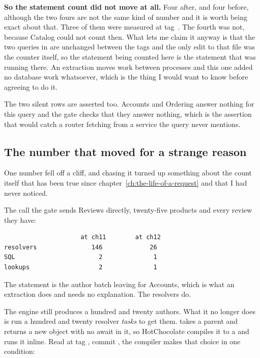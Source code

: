 \textbf{So the statement count did not move at all.} Four after, and four
before, although the two fours are not the same kind of number and it is worth
being exact about that. Three of them were measured at
tag~. The fourth was not, because Catalog could not count then. What
lets me claim it anyway is that the two queries in  are
unchanged between the tags and the only edit to that file was the counter
itself, so the statement being counted here is the statement that was running
there. An extraction moves work between
processes and this one added no database work whatsoever, which is the thing I
would want to know before agreeing to do it.

The two silent rows are asserted too. Accounts and Ordering answer nothing for
this query and the gate checks that they answer nothing, which is the assertion
that would catch a router fetching from a service the query never mentions.

\subsection*{The number that moved for a strange reason}

%
One number fell off a cliff, and chasing it turned up something about the count
itself that has been true since chapter~\ref{ch:the-life-of-a-request} and that
I had never noticed.

The  call the gate sends Reviews directly, twenty-five products
and every review they have:

\begin{verbatim}
                     at ch11        at ch12
resolvers               146             26
SQL                       2              1
lookups                   2              1
\end{verbatim}

The statement is the author batch leaving for Accounts, which is what an
extraction does and needs no explanation. The resolvers do.

The engine still produces a hundred and twenty authors. What it no longer does
is run a hundred and twenty resolver \emph{tasks} to get them.
 takes a parent and returns a new object with no
await in it, so HotChocolate compiles it to a  and runs
it inline. Read at tag , commit , the compiler makes
that choice in one condition:

